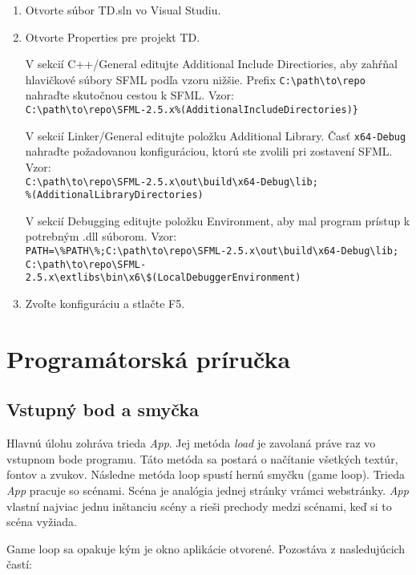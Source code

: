 \documentclass[12pt]{article}
\begin{document}
\begin{enumerate}
    \item Otvorte súbor TD.sln vo Visual Studiu.
    \item Otvorte Properties pre projekt TD.

        V sekcií C++/General editujte Additional Include Directiories, aby zahŕňal
        hlavičkové súbory SFML podľa vzoru nižšie. Prefix \verb|C:\path\to\repo| nahraďte
        skutočnou cestou k SFML. Vzor: \\
        \verb|C:\path\to\repo\SFML-2.5.x%(AdditionalIncludeDirectories)}|


        V sekcií Linker/General editujte položku Additional Library. Časť \verb|x64-Debug|
        nahraďte požadovanou konfiguráciou, ktorú ste zvolili pri zostavení SFML.
        Vzor: \\
        \verb|C:\path\to\repo\SFML-2.5.x\out\build\x64-Debug\lib;| \\
        \verb|%(AdditionalLibraryDirectories)|


        V sekcií Debugging editujte položku Environment, aby mal program prístup
        k potrebným .dll súborom. 
        Vzor: \\
        \verb|PATH=\%PATH\%;C:\path\to\repo\SFML-2.5.x\out\build\x64-Debug\lib;| \\
        \verb|C:\path\to\repo\SFML-2.5.x\extlibs\bin\x6\$(LocalDebuggerEnvironment)|
    \item Zvoľte konfiguráciu a stlačte F5.
\end{enumerate}

\section{Programátorská príručka}

\subsection{Vstupný bod a smyčka}
Hlavnú úlohu zohráva trieda \emph{App}. Jej metóda \emph{load} je zavolaná práve raz vo vstupnom
bode programu. Táto metóda sa postará o načítanie všetkých textúr, fontov a zvukov.
Následne metóda loop spustí hernú smyčku (game loop). Trieda \emph{App} pracuje so scénami.
Scéna je analógia jednej stránky vrámci webstránky. \emph{App} vlastní najviac jednu inštanciu
scény a rieši prechody medzi scénami, keď si to scéna vyžiada.

Game loop sa opakuje kým je okno aplikácie otvorené. Pozostáva z nasledujúcich častí:
\end{document}
